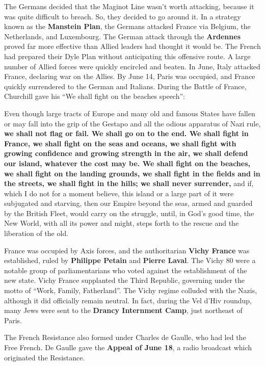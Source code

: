 The Germans decided that the Maginot Line wasn't worth attacking,
because it was quite difficult to breach.
So, they decided to go around it.
In a strategy known as the \textbf{Manstein Plan},
the Germans attacked France via Belgium, the Netherlands, and Luxembourg.
The German attack through the \textbf{Ardennes} proved far more effective
than Allied leaders had thought it would be.
The French had prepared their Dyle Plan without anticipating this offensive route.
A large number of Allied forces were quickly encircled and beaten.
In June, Italy attacked France, declaring war on the Allies.
By June 14, Paris was occupied, and France quickly surrendered to the German and Italians.
During the Battle of France, Churchill gave his ``We shall fight on the beaches speech'':
\begin{quoting}
  Even though large tracts of Europe and many old and famous States have fallen
  or may fall into the grip of the Gestapo and all the odious apparatus of Nazi rule,
  \textbf{%
    we shall not flag or fail.
    We shall go on to the end.
    We shall fight in France, we shall fight on the seas and oceans,
    we shall fight with growing confidence and growing strength in the air,
    we shall defend our island, whatever the cost may be.
    We shall fight on the beaches,
    we shall fight on the landing grounds,
    we shall fight in the fields and in the streets,
    we shall fight in the hills; we shall never surrender,
  }
  and if, which I do not for a moment believe,
  this island or a large part of it were subjugated and starving,
  then our Empire beyond the seas,
  armed and guarded by the British Fleet,
  would carry on the struggle,
  until, in God's good time, the New World, with all its power and might,
  steps forth to the rescue and the liberation of the old.
\end{quoting}

France was occupied by Axis forces,
and the authoritarian \textbf{Vichy France} was established,
ruled by \textbf{Philippe Petain} and \textbf{Pierre Laval}.
The Vichy 80 were a notable group of parliamentarians
who voted against the establishment of the new state.
Vichy France supplanted the Third Republic,
governing under the motto of ``Work, Family, Fatherland''.
The Vichy regime colluded with the Nazis, although it did officially remain neutral.
In fact, during the Vel d'Hiv roundup, many Jews were sent to the \textbf{Drancy Internment Camp},
just northeast of Paris.

The French Resistance also formed under Charles de Gaulle, who had led the Free French.
De Gaulle gave the \textbf{Appeal of June 18}, a radio broadcast which originated the Resistance.

